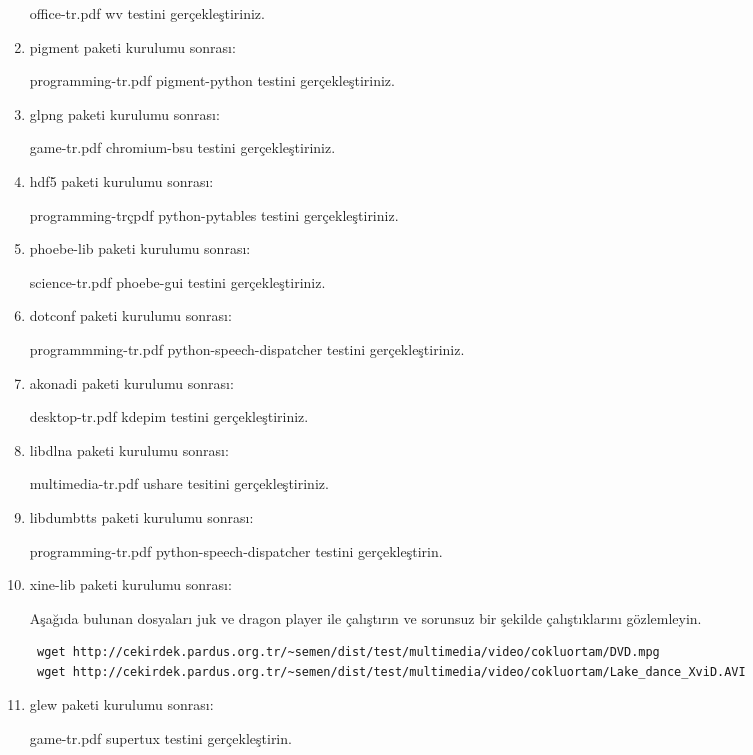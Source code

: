\documentclass[a4paper,10pt]{article}
\begin{document}
\begin{enumerate}
office-tr.pdf wv testini gerçekleştiriniz.

\item pigment paketi kurulumu sonrası:

programming-tr.pdf pigment-python testini gerçekleştiriniz.

\item glpng paketi kurulumu sonrası:

game-tr.pdf chromium-bsu testini gerçekleştiriniz.

\item hdf5 paketi kurulumu sonrası:

programming-trçpdf python-pytables testini gerçekleştiriniz.

\item phoebe-lib paketi kurulumu sonrası:

science-tr.pdf phoebe-gui testini gerçekleştiriniz.

\item dotconf paketi kurulumu sonrası:

programmming-tr.pdf python-speech-dispatcher testini gerçekleştiriniz.

\item akonadi paketi kurulumu sonrası:

desktop-tr.pdf kdepim testini gerçekleştiriniz.

\item libdlna paketi kurulumu sonrası:

multimedia-tr.pdf ushare tesitini gerçekleştiriniz.

\item libdumbtts paketi kurulumu sonrası:

programming-tr.pdf python-speech-dispatcher testini gerçekleştirin.

\item xine-lib paketi kurulumu sonrası:

Aşağıda bulunan dosyaları juk ve dragon player ile çalıştırın ve sorunsuz bir şekilde çalıştıklarını gözlemleyin.

\begin{verbatim}
 wget http://cekirdek.pardus.org.tr/~semen/dist/test/multimedia/video/cokluortam/DVD.mpg
 wget http://cekirdek.pardus.org.tr/~semen/dist/test/multimedia/video/cokluortam/Lake_dance_XviD.AVI
\end{verbatim}


\item glew paketi kurulumu sonrası:

game-tr.pdf supertux testini gerçekleştirin.


\end{enumerate}
\end{document}
